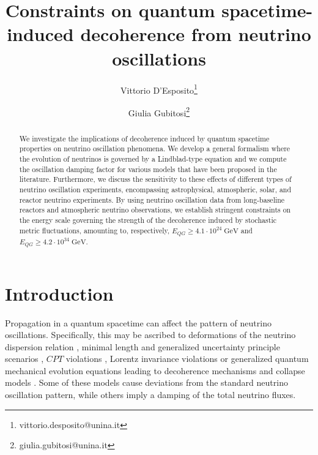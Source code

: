 \documentclass[11pt]{article}
\begin{document}
\title{{\bf Constraints on quantum spacetime-induced  decoherence from neutrino oscillations}}
\date{}
\author[]{
Vittorio D'Esposito\thanks{vittorio.desposito@unina.it} \and Giulia Gubitosi\thanks{giulia.gubitosi@unina.it}}



\maketitle

\begin{abstract}
We investigate the implications of decoherence induced by quantum spacetime properties on neutrino oscillation phenomena.
We develop a general formalism where the evolution of neutrinos  is governed by a Lindblad-type  equation and  we  compute the oscillation damping factor for various models that have been proposed in the literature. 
Furthermore, we discuss the sensitivity to these effects of different types of neutrino oscillation experiments, encompassing astrophysical, atmospheric, solar, and reactor neutrino experiments. By using neutrino oscillation data from long-baseline reactors and atmospheric neutrino observations, we establish stringent constraints on  the energy   scale governing the strength of the decoherence induced by stochastic metric fluctuations,   amounting to, respectively, $E_{QG}\geq 4.1 \cdot 10^{24}\; \text{GeV}$ and   $E_{QG}\geq 4.2\cdot 10^{34}\;\text{GeV}$.

\end{abstract}

\section{Introduction}

Propagation in a quantum spacetime can affect the pattern of neutrino oscillations. Specifically, this may be ascribed to deformations of the neutrino dispersion relation \cite{Christian:2004xb}, minimal length and generalized uncertainty principle scenarios \cite{Sprenger:2011jc}, $CPT$ violations \cite{Mavromatos:2007hv, Mavromatos:2004sz, Barenboim:2004wu}, Lorentz invariance violations \cite{IceCube:2017qyp,IceCube:2021tdn} or generalized quantum mechanical evolution equations leading to decoherence mechanisms and collapse models \cite{Christian:2005qa, ELLIS199237, Ellis:1997jw}. Some of these models cause deviations from the standard neutrino oscillation pattern, while others \cite{Mavromatos:2007hv, IceCube:2017qyp, IceCube:2021tdn} imply a damping of the total neutrino fluxes. 
\end{document}

